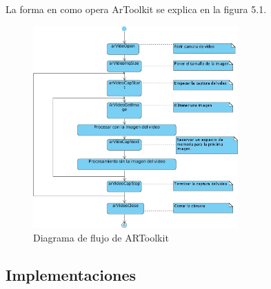 \documentclass[12pt,a4paper,spanish,openany]{book}
\begin{document}
La forma en como opera ArToolkit se explica en la figura 5.1.

\begin{figure}
\begin{center}
\includegraphics[width=0.7\textwidth]{./img/artoolkitDiag.jpg}
\caption{Diagrama de flujo de ARToolkit}
\end{center}
\end{figure}

\subsection{Implementaciones}
\end{document}
